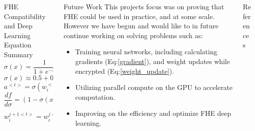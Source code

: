 \documentclass{beamer}
\begin{document}
\begin{frame}
    \begin{columns}
      \begin{column}{0.3\textwidth}
        \begin{block}{FHE Compatibility and Deep Learning Equation Summary}
          \begin{equation}
            \label{sigmoid}
            \sigma(x) = \frac{1}{1+e^{-x}}
          \end{equation}
          \begin{equation}
            \label{sigmoid_approx}
            \sigma(x) \approx 0.5 + 0.197x + -0.004x^3
          \end{equation}
          \begin{equation}
            \label{cnn_activation}
            a^{<t>}=\sigma(w_{i}^{<t>}x^{<t>}+b_i^{<t>})
          \end{equation}
          \begin{equation}
            \label{gradient}
            \frac{df}{d\sigma} = (1-\sigma(x)) * \sigma(x)
          \end{equation}
          \begin{equation}
            \label{weight_update}
            w_i^{j+1<t>} = w_i^{j<t>} - (l * \frac{df}{dw_i^{j<t>}})
          \end{equation}
        \end{block}
      \end{column}
      \begin{column}{0.3\textwidth}
        \begin{block}{Future Work}
          This projects focus was on proving that FHE could be used in practice, and at some scale. However we have begun and would like to in future continue working on  solving problems such as:
          \begin{itemize}
            \item Training neural networks, including calculating gradients (Eq:\ref{gradient}), and weight updates while encrypted (Eq:\ref{weight_update}).
            \item Utilizing parallel compute on the GPU to accelerate computation.
            \item Improving on the efficiency and optimize FHE deep learning.
          \end{itemize}
        \end{block}
      \end{column}
      \begin{column}{0.3\textwidth}
        \begin{block}{References}
          \printbibliography
        \end{block}
      \end{column}
    \end{columns}
  \end{frame}
\end{document}

